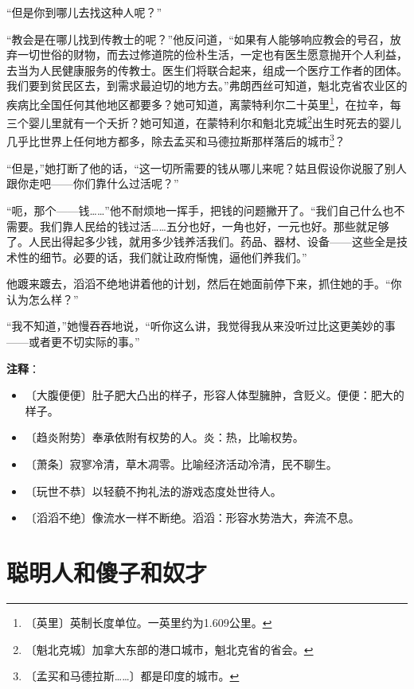 \documentclass[12pt,UTF-8,openany]{ctexbook}
\begin{document}
\begin{normalsize}
    “但是你到哪儿去找这种人呢？”
    
    “教会是在哪儿找到传教士的呢？”他反问道，“如果有人能够响应教会的号召，放弃一切世俗的财物，而去过修道院的俭朴生活，一定也有医生愿意抛开个人利益，去当为人民健康服务的传教士。医生们将联合起来，组成一个医疗工作者的团体。我们要到贫民区去，到需求最迫切的地方去。”弗朗西丝可知道，魁北克省农业区的疾病比全国任何其他地区都要多？她可知道，离蒙特利尔二十英里\footnote{〔英里〕英制长度单位。一英里约为1.609公里。}，在拉辛，每三个婴儿里就有一个夭折？她可知道，在蒙特利尔和魁北克城\footnote{〔魁北克城〕加拿大东部的港口城市，魁北克省的省会。}出生时死去的婴儿几乎比世界上任何地方都多，除去孟买和马德拉斯那样落后的城市\footnote{〔孟买和马德拉斯……〕都是印度的城市。}？
    
    “但是，”她打断了他的话，“这一切所需要的钱从哪儿来呢？姑且假设你说服了别人跟你走吧——你们靠什么过活呢？”
    
    “呃，那个——钱……”他不耐烦地一挥手，把钱的问题撇开了。“我们自己什么也不需要。我们靠人民给的钱过活……五分也好，一角也好，一元也好。那些就足够了。人民出得起多少钱，就用多少钱养活我们。药品、器材、设备——这些全是技术性的细节。必要的话，我们就让政府惭愧，逼他们养我们。”
    
    他踱来踱去，滔滔不绝地讲着他的计划，然后在她面前停下来，抓住她的手。“你认为怎么样？”
    
    “我不知道，”她慢吞吞地说，“听你这么讲，我觉得我从来没听过比这更美妙的事——或者更不切实际的事。”
    
\end{normalsize}


\newpage

\textbf{注释}：

\vspace{-1em}

\begin{itemize}
    \setlength\itemsep{-0.2em}
    \item 〔大腹便便〕肚子肥大凸出的样子，形容人体型臃肿，含贬义。便便：肥大的样子。
    \item 〔趋炎附势〕奉承依附有权势的人。炎：热，比喻权势。
    \item 〔萧条〕寂寥冷清，草木凋零。比喻经济活动冷清，民不聊生。
    \item 〔玩世不恭〕以轻藐不拘礼法的游戏态度处世待人。
    \item 〔滔滔不绝〕像流水一样不断绝。滔滔：形容水势浩大，奔流不息。
\end{itemize}

\chapter{聪明人和傻子和奴才}
\end{document}
